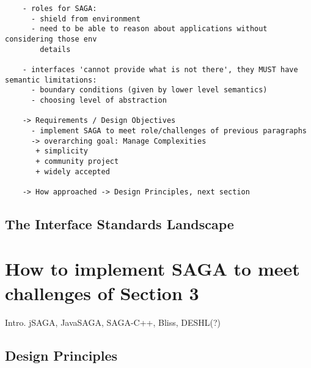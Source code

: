 \documentclass[a4paper,10pt]{article}
\begin{document}
  \begin{verbatim}
    - roles for SAGA: 
      - shield from environment
      - need to be able to reason about applications without considering those env
        details

    - interfaces 'cannot provide what is not there', they MUST have semantic limitations:
      - boundary conditions (given by lower level semantics)
      - choosing level of abstraction

    -> Requirements / Design Objectives
      - implement SAGA to meet role/challenges of previous paragraphs
      -> overarching goal: Manage Complexities
       + simplicity
       + community project
       + widely accepted

    -> How approached -> Design Principles, next section

  \end{verbatim}

 \subsection{The Interface Standards Landscape}
 \label{interface_landscape}




\section{How to implement SAGA to meet challenges of Section 3}
\label{saga_impls}

 Intro. jSAGA, JavaSAGA, SAGA-C++, Bliss, DESHL(?)

 \subsection{Design Principles}
\end{document}
